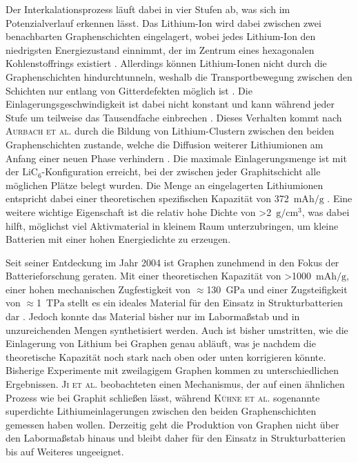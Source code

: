 Der Interkalationsprozess läuft dabei in vier Stufen ab, was sich im Potenzialverlauf erkennen lässt. Das Lithium-Ion wird dabei zwischen zwei benachbarten Graphenschichten eingelagert, wobei jedes Lithium-Ion den niedrigsten Energiezustand einnimmt, der im Zentrum eines hexagonalen Kohlenstoffrings existiert \cite{Sole2014,Weng2023}. Allerdings können Lithium-Ionen nicht durch die Graphenschichten hindurchtunneln, weshalb die Transportbewegung zwischen den Schichten nur entlang von Gitterdefekten möglich ist \cite{Nishidate2005}. Die Einlagerungsgeschwindigkeit ist dabei nicht konstant und kann während jeder Stufe um teilweise das Tausendfache einbrechen \cite{Levi1997}. Dieses Verhalten kommt nach \textsc{Aurbach et al.} durch die Bildung von Lithium-Clustern zwischen den beiden Graphenschichten zustande, welche die Diffusion weiterer Lithiumionen am Anfang einer neuen Phase verhindern \cite{Markevich2005}. Die maximale Einlagerungsmenge ist mit der $\text{LiC}_\text{6}$-Konfiguration erreicht, bei der zwischen jeder Graphitschicht alle möglichen Plätze belegt wurden. Die Menge an eingelagerten Lithiumionen entspricht dabei einer theoretischen spezifischen Kapazität von 372~$\si{\mA \hour \per \g}$ \cite{Winter1998}. 
Eine weitere wichtige Eigenschaft ist die relativ hohe Dichte von >2~$\si{\g \per \cm \cubed}$, was dabei hilft, möglichst viel Aktivmaterial in kleinem Raum unterzubringen, um kleine Batterien mit einer hohen Energiedichte zu erzeugen.

Seit seiner Entdeckung im Jahr 2004 \cite{Novoselov2004} ist Graphen zunehmend in den Fokus der Batterieforschung geraten. Mit einer theoretischen Kapazität von >1000~$\si{\mA \hour \per \g}$, einer hohen mechanischen Zugfestigkeit von $\approx$130~$\si{\GPa}$ und einer Zugsteifigkeit von $\approx$1~$\si{\tera \Pa}$ stellt es ein ideales Material für den Einsatz in Strukturbatterien dar \cite{Novoselov2012}. Jedoch konnte das Material bisher nur im Labormaßstab und in unzureichenden Mengen synthetisiert werden. Auch ist bisher umstritten, wie die Einlagerung von Lithium bei Graphen genau abläuft, was je nachdem die theoretische Kapazität noch stark nach oben oder unten korrigieren könnte. Bisherige Experimente mit zweilagigem Graphen kommen zu unterschiedlichen Ergebnissen. \textsc{Ji et al.} beobachteten einen Mechanismus, der auf einen ähnlichen Prozess wie bei Graphit schließen lässt, während \textsc{Kühne et al.} sogenannte superdichte Lithiumeinlagerungen zwischen den beiden Graphenschichten gemessen haben wollen. Derzeitig geht die Produktion von Graphen nicht über den Labormaßstab hinaus und bleibt daher für den Einsatz in Strukturbatterien bis auf Weiteres ungeeignet.

